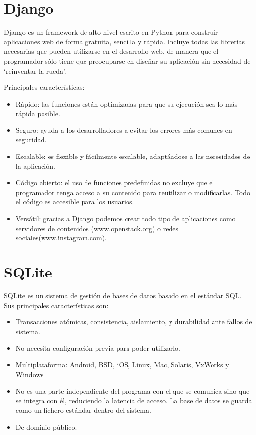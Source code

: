 \documentclass[a4paper, 12pt]{book}
\begin{document}
\section{Django} 
\label{sec:seccion3}
Django es un framework de alto nivel escrito en Python para construir aplicaciones web de forma gratuita, sencilla y rápida. Incluye todas las librerías necesarias que pueden utilizarse en el desarrollo web, de manera que el programador sólo tiene que preocuparse en diseñar su aplicación sin necesidad de `reinventar la rueda'.

Principales características:
\begin{itemize}
	\item Rápido: las funciones están optimizadas para que su ejecución sea lo más rápida posible.
	\item Seguro: ayuda a los desarrolladores a evitar los errores más comunes en seguridad.  
	\item Escalable: es flexible y fácilmente escalable, adaptándose a las necesidades de la aplicación. 
	\item Código abierto: el uso de funciones predefinidas no excluye que el programador tenga acceso a su contenido para reutilizar o modificarlas. Todo el código es accesible para los usuarios. 
	\item Versátil: gracias a Django podemos crear todo tipo de aplicaciones como servidores de contenidos (\url{www.openstack.org}) o redes sociales(\url{www.instagram.com}).
\end{itemize}
\section{SQLite} 
\label{sec:seccion4}
SQLite es un sistema de gestión de bases de datos basado en el estándar SQL. Sus principales características son:
\begin{itemize}
	\item Transacciones atómicas, consistencia, aislamiento, y durabilidad ante fallos de sistema. 
	\item No necesita configuración previa para poder utilizarlo.
	\item Multiplataforma: Android, BSD, iOS, Linux, Mac, Solaris, VxWorks y Windows
	\item No es una parte independiente del programa con el que se comunica sino que se integra con él, reduciendo la latencia de acceso. La base de datos se guarda como un fichero estándar dentro del sistema. 
	\item De dominio público. 
\end{itemize}
\end{document}
